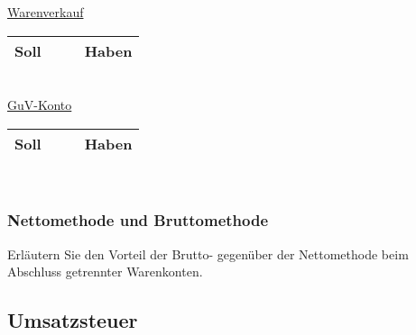 \documentclass[paper=a4, fontsize=11pt]{scrartcl}
\numberwithin{equation}{section}
\numberwithin{figure}{section}
\numberwithin{table}{section}
\begin{document}
\underline{Warenverkauf}

\begin{tabular}{cc|cc}
\hline
Soll & & & Haben \\
\hline
\end{tabular}
\\

\underline{GuV-Konto}

\begin{tabular}{cc|cc}
\hline
Soll & & & Haben \\
\hline
\end{tabular}
\\


\subsubsection{Nettomethode und Bruttomethode}

Erläutern Sie den Vorteil der Brutto- gegenüber der Nettomethode beim Abschluss getrennter Warenkonten.


\subsection{Umsatzsteuer}

\end{document}
